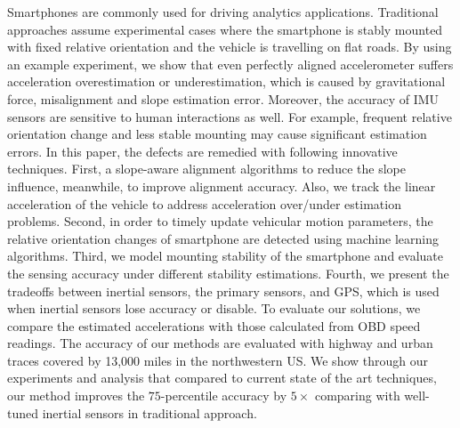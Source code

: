 


Smartphones are commonly used for driving analytics applications. 
Traditional approaches assume experimental
cases where the smartphone is stably mounted with fixed relative orientation
and the vehicle is travelling on flat roads. 
By using an example experiment, we show that 
even perfectly aligned accelerometer suffers acceleration overestimation or underestimation, 
which is caused by gravitational force, misalignment and slope estimation error.  
Moreover, the accuracy of IMU sensors are sensitive to human interactions
as well. 
For example, frequent relative orientation change and less stable mounting
may cause significant estimation errors. 
In this paper, the defects are remedied
with following innovative techniques. 
First, a slope-aware alignment algorithms to reduce the slope influence, 
meanwhile, to improve alignment accuracy. Also, we track the linear 
acceleration of the vehicle to address acceleration over/under estimation problems. 
Second, in order to timely update 
vehicular motion parameters, the relative orientation changes of 
smartphone are detected using machine learning algorithms. 
Third, we model mounting stability of the smartphone and 
evaluate the sensing accuracy under different stability estimations.  
Fourth, we present the tradeoffs between inertial sensors, the primary sensors, 
and GPS, which is used when inertial sensors lose accuracy or disable. 
To evaluate our solutions, we compare the estimated 
accelerations with those calculated from OBD speed readings.  
The accuracy of our methods are evaluated with highway and urban traces
covered by 13,000 miles in the northwestern US.
We show through our experiments and analysis that
compared to current state of the art techniques, 
our method improves the $75$-percentile accuracy 
by $5\times$ comparing with well-tuned inertial sensors in traditional approach. 



